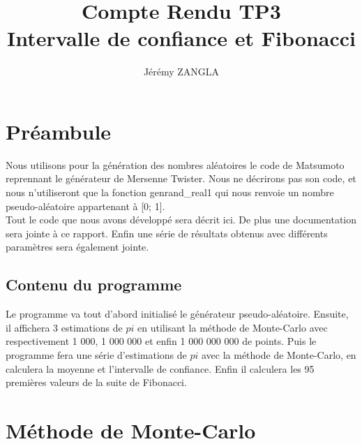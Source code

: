 \documentclass[a4paper]{article}
\title{Compte Rendu TP3\\Intervalle de confiance et Fibonacci}
\author{Jérémy ZANGLA}
\begin{document}
\maketitle
\pagebreak
\tableofcontents
\pagebreak
\section{Préambule}
Nous utilisons pour la génération des nombres aléatoires le code de Matsumoto reprennant le générateur de Mersenne Twister. Nous ne décrirons pas son code, et nous n'utiliseront que la fonction genrand\_real1 qui nous renvoie un nombre pseudo-aléatoire appartenant à [0; 1].
\\
Tout le code que nous avons développé sera décrit ici. De plus une documentation sera jointe à ce rapport. Enfin une série de résultats obtenus avec différents paramètres sera également jointe.

\subsection{Contenu du programme}
Le programme va tout d'abord initialisé le générateur pseudo-aléatoire. Ensuite, il affichera 3 estimations de $pi$ en utilisant la méthode de Monte-Carlo avec respectivement 1 000, 1 000 000 et enfin 1 000 000 000 de points.
Puis le programme fera une série d'estimations de $pi$ avec la méthode de Monte-Carlo, en calculera la moyenne et l'intervalle de confiance.
Enfin il calculera les 95 premières valeurs de la suite de Fibonacci.

\begin{mdframed}[backgroundcolor=light-gray, roundcorner=20pt,
	leftmargin=-45, rightmargin=-45, 
	innerleftmargin=20, innertopmargin=1, innerbottommargin=1, 
	outerlinewidth=1, linecolor=darkgray]
	
\end{mdframed}


\section{Méthode de Monte-Carlo}
\end{document}
